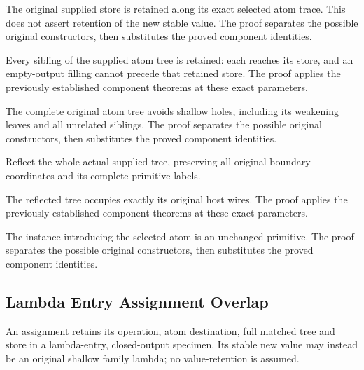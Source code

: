 The original supplied store is retained along its exact selected atom
trace. This does not assert retention of the new stable value.
The proof separates the possible original constructors, then substitutes the proved component identities.
\par{}

Every sibling of the supplied atom tree is retained: each reaches its
store, and an empty-output filling cannot precede that retained store.
The proof applies the previously established component theorems at these exact parameters.
\par{}

The complete original atom tree avoids shallow holes, including its
weakening leaves and all unrelated siblings.
The proof separates the possible original constructors, then substitutes the proved component identities.
\par{}

Reflect the whole actual supplied tree, preserving all original boundary
coordinates and its complete primitive labels.
\par{}

The reflected tree occupies exactly its original host wires.
The proof applies the previously established component theorems at these exact parameters.
\par{}

The instance introducing the selected atom is an unchanged primitive.
The proof separates the possible original constructors, then substitutes the proved component identities.
\par{}

\subsection{Lambda Entry Assignment Overlap}
An assignment retains its operation, atom destination, full matched tree
and store in a lambda-entry, closed-output specimen. Its stable new value may
instead be an original shallow family lambda; no value-retention is assumed.


